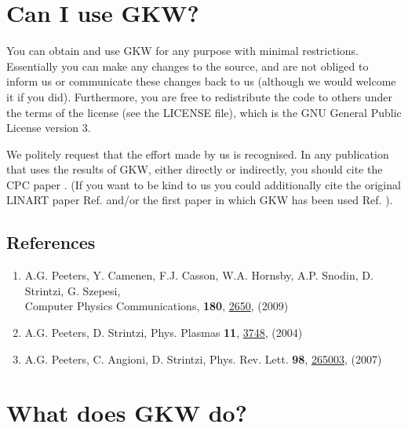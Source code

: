 \section*{Can I use GKW?}

You can obtain and use GKW for any purpose with minimal restrictions.
Essentially you can make any changes to the source, and are not obliged to inform us or communicate 
these changes back to us (although we would welcome it if you did).  
Furthermore, you are free to redistribute the code to others under the terms of the
license (see the LICENSE file), which is the GNU General Public License version 3.

We politely request that the effort made by us is recognised. 
In any publication that uses the results of GKW, either directly or indirectly,
you should cite the CPC paper \cite{CPC-paper}. (If you want to be kind to us you could additionally
cite the original LINART paper Ref. \cite{PEE04} and/or the first paper in which GKW has been
used Ref. \cite{PEE07}).

\subsection*{References}

\begin{enumerate}
\item A.G. Peeters, Y. Camenen, F.J. Casson, W.A. Hornsby, A.P. Snodin, D. Strintzi, G. Szepesi,\\
Computer Physics Communications, {\bf 180}, \href{http://dx.doi.org/10.1016/j.cpc.2009.07.001}{2650}, (2009)
\item A.G. Peeters, D. Strintzi, Phys. Plasmas {\bf 11},  \href{http://dx.doi.org/10.1063/1.1762876}{3748}, (2004)
\item A.G. Peeters, C. Angioni, D. Strintzi, Phys. Rev. Lett. {\bf 98},  \href{http://dx.doi.org/10.1103/PhysRevLett.98.265003}{265003}, (2007)
\end{enumerate}

\pagebreak


\section*{What does GKW do?}

